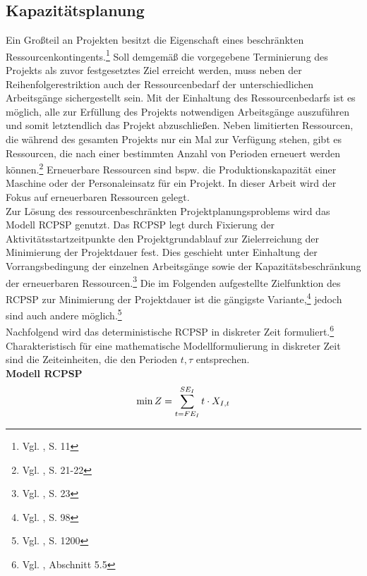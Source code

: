 \documentclass[a4paper,12pt,parskip,bibtotoc,liststotoc]{article}
\begin{document}
\subsection{Kapazitätsplanung}
Ein Großteil an Projekten besitzt die Eigenschaft eines beschränkten Ressourcenkontingents.\footnote{Vgl. \cite{kellenbrink2014einfuhrung}, S. 11} Soll demgemäß die vorgegebene Terminierung des Projekts als zuvor festgesetztes Ziel erreicht werden, muss neben der Reihenfolgerestriktion auch der Ressourcenbedarf der unterschiedlichen Arbeitsgänge sichergestellt sein. Mit der Einhaltung des Ressourcenbedarfs ist es möglich, alle zur Erfüllung des Projekts notwendigen Arbeitsgänge auszuführen und somit letztendlich das Projekt abzuschließen. Neben limitierten Ressourcen, die während des gesamten Projekts nur ein Mal zur Verfügung stehen, gibt es Ressourcen, die nach einer bestimmten Anzahl von Perioden erneuert werden können.\footnote{Vgl. \cite{neumann2003project}, S. 21-22} Erneuerbare Ressourcen sind bspw. die Produktionskapazität einer Maschine oder der Personaleinsatz für ein Projekt. In dieser Arbeit wird der Fokus auf erneuerbaren Ressourcen gelegt.\\

Zur Lösung des ressourcenbeschränkten Projektplanungsproblems wird das Modell RCPSP genutzt. Das RCPSP legt durch Fixierung der Aktivitätsstartzeitpunkte den Projektgrund\-ablauf zur Zielerreichung der Minimierung der Projektdauer fest. Dies geschieht unter Einhaltung der Vorrangsbedingung der einzelnen Arbeitsgänge sowie der Kapazitätsbeschränkung der erneuerbaren Ressourcen.\footnote{Vgl. \cite{demeulemeester2011robust}, S. 23} Die im Folgenden aufgestellte Zielfunktion des RCPSP zur Minimierung der Projektdauer ist die gängigste Variante,\footnote{Vgl. \cite{drexl1997neuere}, S. 98} jedoch sind auch andere möglich.\footnote{Vgl. \cite{talbot1982resource}, S. 1200}\\

Nachfolgend wird das deterministische RCPSP in diskreter Zeit formuliert.\footnote{Vgl. \cite{domschke2005einfuhrung}, Abschnitt 5.5} Charakteristisch für eine mathematische Modellformulierung in diskreter Zeit sind die Zeiteinheiten, die den Perioden $t, \tau$ entsprechen.\\

\textbf{Modell RCPSP}
\begin{eqnarray} \label{Ziel}
\min Z = \sum_{t=FE_{I}}^{SE_{I}}t \cdot X_{I,t}\hfill  
\end{eqnarray}
\end{document}
